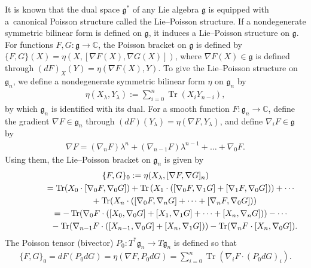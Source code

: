 \documentclass[10pt,a4paper]{amsart}
\numberwithin{equation}{section}
\begin{document}
It is known that the dual space $\mathfrak{g}^*$ of any Lie algebra $\mathfrak{g}$ is equipped with a~canonical Poisson structure called the Lie--Poisson structure. If a nondegenerate symmetric bilinear form  is def\/ined on $\mathfrak{g}$,
it induces a Lie--Poisson structure on $\mathfrak{g}$. For functions $F, G\colon \mathfrak{g} \to \mathbb{C}$, the Poisson bracket on $\mathfrak{g}$ is def\/ined by $\{ F, G\}(X) = \eta (X, [\nabla F(X), \nabla G(X)])$, where $\nabla F(X) \in \mathfrak{g}$ is def\/ined through $(dF)_X(Y) = \eta (\nabla F(X), Y)$.
To give the Lie--Poisson structure on $\mathfrak{g}_n$, we def\/ine a nondegenerate symmetric bilinear form $\eta$ on $\mathfrak{g}_n$ by
\begin{gather*}
\eta (X_\lambda , Y_\lambda ):= \sum^n_{i=0} \operatorname{Tr}(X_iY_{n-i}),
\end{gather*}
by which $\mathfrak{g}_n$ is identif\/ied with its dual. For a smooth function $F\colon \mathfrak{g}_n \to \mathbb{C}$, def\/ine the gradient $\nabla F \in \mathfrak{g}_n$ through $ (dF)(Y_\lambda ) = \eta (\nabla F, Y_\lambda )$, and def\/ine $\nabla _iF\in \mathfrak{g}$ by
\begin{gather*}
 \nabla F = (\nabla _n F) \lambda ^n + (\nabla _{n-1}F) \lambda ^{n-1} + \dots + \nabla _0 F.
\end{gather*}
Using them, the Lie--Poisson bracket on $\mathfrak{g}_n$ is given by
\begin{gather*}
\{ F, G\}_0 := \eta (X_\lambda , [\nabla F, \nabla G]_n) \\
\hphantom{\{ F, G\}_0}{} = \operatorname{Tr}(X_0 \cdot [\nabla _0F, \nabla _0G])
 + \operatorname{Tr}\left( X_1\cdot ( [\nabla _0F, \nabla _1G]+[\nabla _1F, \nabla _0G]) \right) +\cdots \\
\hphantom{\{ F, G\}_0=}{} + \operatorname{Tr} (X_n\cdot ( [\nabla _0F, \nabla _nG] + \dots + [\nabla _nF, \nabla _0G])) \\
\hphantom{\{ F, G\}_0}{}= -\operatorname{Tr} (\nabla _0F \cdot ([X_0, \nabla _0G]+[X_1, \nabla _1G]+ \dots + [X_n, \nabla _nG])) - \cdots \\
\hphantom{\{ F, G\}_0=}{} -\operatorname{Tr}(\nabla _{n-1}F \cdot ([X_{n-1}, \nabla _0G] + [X_n, \nabla _1G])) - \operatorname{Tr} (\nabla _nF \cdot [X_n, \nabla _0G]).
\end{gather*}
The Poisson tensor (bivector) $P_0 \colon T^*\mathfrak{g}_n \to T\mathfrak{g}_n$ is def\/ined so that
\begin{gather*}
\{ F, G\}_0 = dF (P_0dG) = \eta (\nabla F, P_0dG) = \sum^n_{i=0} \operatorname{Tr}(\nabla _iF \cdot (P_0dG)_i).
\end{gather*}
\end{document}
